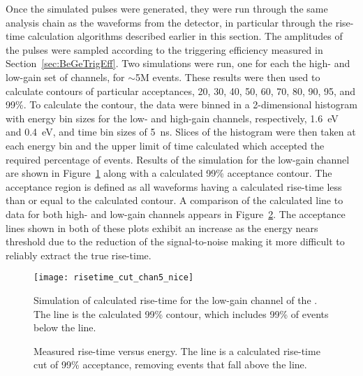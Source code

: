 	Once the simulated pulses were generated, they were run through the same analysis chain as the waveforms from the detector, in particular through the rise-time calculation algorithms described earlier in this section.  The amplitudes of the pulses were sampled according to the triggering efficiency measured in Section~\ref{sec:BeGeTrigEff}.  Two simulations were run, one for each the high- and low-gain set of channels, for $\sim$5M events.  These results were then used to calculate contours of particular acceptances, 20, 30, 40, 50, 60, 70, 80, 90, 95, and 99\%.  To calculate the contour, the data were binned in a 2-dimensional histogram with energy bin sizes for the low- and high-gain channels, respectively, 1.6~eV and 0.4~eV, and time bin sizes of 5~ns.  Slices of the histogram were then taken at each energy bin and the upper limit of time calculated which accepted the required percentage of events.  Results of the simulation for the low-gain channel are shown in Figure~\ref{fig:RisetimeSimulation} along with a calculated 99\% acceptance contour.  The acceptance region is defined as all waveforms having a calculated rise-time less than or equal to the calculated contour.  A comparison of the calculated line to data for both high- and low-gain channels appears in Figure~\ref{fig:RisetimeDataVsCut}.  The acceptance lines shown in both of these plots exhibit an increase as the energy nears threshold due to the reduction of the signal-to-noise making it more difficult to reliably extract the true rise-time.
					
				\begin{figure}
					\centering
					\texttt{[image: risetime\_cut\_chan5\_nice]}
					\caption[Simulation of calculated rise-time for the low-gain channel of the \bege]
					{Simulation of calculated rise-time for the low-gain channel of the \bege.  
					The line is the calculated 99\% contour, which includes 99\% of events below the line.}
					\label{fig:RisetimeSimulation}
				\end{figure}	
	
				\begin{figure}
					\centering
					\def\plotwidth{0.8\textwidth}					
					\caption[Measured rise-time vs.~energy with a calculated rise-time cut of 99\% acceptance]
					{Measured rise-time versus energy.  The line is a calculated rise-time cut of 99\% acceptance, 
					removing events that fall above the line.}
					\label{fig:RisetimeDataVsCut}
				\end{figure}	
	
